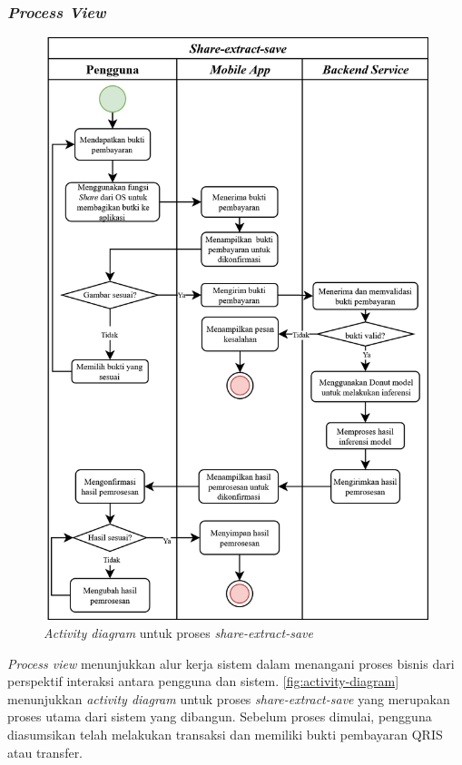 \subsubsection{\emph{Process View}}
\label{subsubsec:process-view}

\begin{figure}[htbp]
    \centering
    \includegraphics[width=.90625\textwidth]{images/activity-diagram.png}
    \caption{\emph{Activity diagram} untuk proses \emph{share-extract-save}}
    \label{fig:activity-diagram}
\end{figure}

\emph{Process view} menunjukkan alur kerja sistem dalam menangani proses bisnis dari perspektif interaksi antara pengguna dan sistem. \autoref{fig:activity-diagram} menunjukkan \emph{activity diagram} untuk proses \emph{share-extract-save} yang merupakan proses utama dari sistem yang dibangun. Sebelum proses dimulai, pengguna diasumsikan telah melakukan transaksi dan memiliki bukti pembayaran QRIS atau transfer. 

